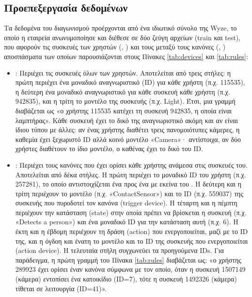 \subsection{Προεπεξεργασία δεδομένων}\label{ssec:v1-preprocessing}
Τα δεδομένα του διαγωνισμού προέρχονται από ένα ιδιωτικό σύνολο της Wyze, το οποίο η εταιρεία ανωνυμοποίησε \cite{noauthor_wyzelabsrulerecommendation_nodate} και διέθεσε σε δύο ζεύγη αρχείων (train και test), που αφορούν τις συσκευές των χρηστών (, ) και τους μεταξύ τους κανόνες (, ) αποσπάσματα των οποίων παρουσιάζονται στους Πίνακες \ref{tab:devices} και \ref{tab:rules}:
\begin{itemize}
    \item {}: Περιέχει τις συσκευές όλων των χρηστών. Αποτελείται από τρεις στήλες: η πρώτη περιέχει ένα μοναδικό αναγνωριστικό (ID) για κάθε χρήστη (π.χ. 115535), η δεύτερη ένα μοναδικό αναγνωριστικό για κάθε συσκευή κάθε χρήστη (π.χ. 942835), και η τρίτη το μοντέλο της συσκευής (π.χ. Light). Έτσι, μια γραμμή διαβάζεται ως «ο χρήστης 115535 κατέχει τη συσκευή 942835, η οποία είναι λαμπτήρας». Κάθε συσκευή έχει το δικό της αναγνωριστικό ακόμη και αν είναι ίδιου τύπου με άλλες: αν ένας χρήστης διαθέτει τρεις πανομοιότυπες κάμερες, η καθεμία έχει ξεχωριστό ID αλλά κοινό μοντέλο «Camera»· αντίστοιχα, αν δύο χρήστες διαθέτουν το ίδιο μοντέλο, ο καθένας έχει το δικό του ID.
    \item {}: Περιέχει τους κανόνες που έχει ορίσει κάθε χρήστης ανάμεσα στις συσκευές του. Αποτελείται από δέκα στήλες. Η πρώτη περιέχει το μοναδικό ID του χρήστη (π.χ. 257281), το οποίο αντιστοιχίζεται ένα προς ένα με εκείνα του . Η δεύτερη και η τρίτη περιέχουν το μοντέλο (π.χ. «ContactSensor») και το ID (π.χ. 559037) της συσκευής που πυροδοτεί τον κανόνα (trigger device). Η τέταρτη και η πέμπτη περιέχουν την κατάσταση (state) στην οποία πρέπει να βρίσκεται η συσκευή (π.χ. «Detects a person») και ένα μοναδικό ID για την κατάσταση αυτή (π.χ. 6). Η έκτη και η έβδομη περιέχουν τη δράση (action) που ενεργοποιείται, μαζί με το ID της, και η όγδοη και ένατη το μοντέλο και το ID της συσκευής που ενεργοποιείται (action device). Η τελευταία στήλη συγχωνεύει τα προηγούμενα IDs. Για παράδειγμα, η πρώτη γραμμή του Πίνακα \ref{tab:rules} διαβάζεται ως: «ο χρήστης 289923 έχει ορίσει έναν κανόνα σύμφωνα με τον οποίο, όταν η συσκευή 1507149 (κάμερα) εντοπίσει ένα κατοικίδιο (ID=7), τότε η συσκευή 1492326 (κάμερα) τίθεται σε λειτουργία (ID=41)».
\end{itemize}

